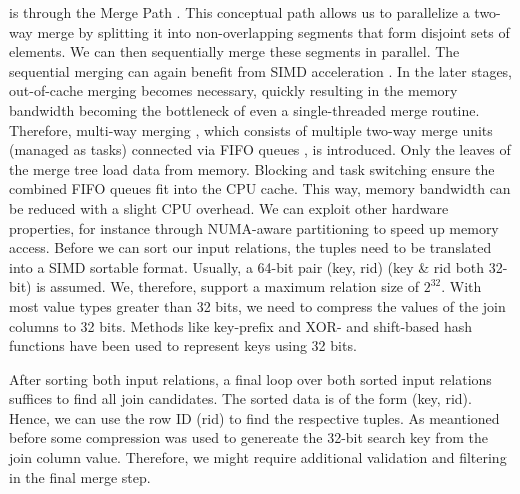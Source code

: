 is through the Merge Path \cite{MergePath}. This conceptual path allows us to parallelize a two-way merge by splitting
it into non-overlapping segments that form disjoint sets of elements. We can then sequentially
merge these segments in parallel. The sequential merging can again benefit from SIMD acceleration \cite{Watkins}.
In the later stages, out-of-cache merging becomes necessary, quickly resulting in the memory
bandwidth becoming the bottleneck of even a single-threaded merge routine. Therefore, multi-way
merging \cite{Balkesen}, which consists of multiple two-way merge units (managed as tasks) connected via FIFO queues
, is introduced. Only the leaves of the merge tree load data from memory. Blocking and task switching 
ensure the combined FIFO queues fit into the CPU cache. This way, memory bandwidth can be reduced
with a slight CPU overhead. We can exploit other hardware properties, for instance through 
NUMA-aware partitioning to speed up memory access.
Before we can sort our input relations, the tuples need to be translated into a SIMD sortable
format. Usually, a 64-bit pair (key, rid) (key \& rid both 32-bit) is assumed. We, therefore,
support a maximum relation size of $2^{32}$. With most value types greater
than 32 bits, we need to compress the values of the join columns to 32 bits. Methods like 
key-prefix \cite{chris_nyberg__1994} and XOR- and shift-based hash functions \cite{1319989} have 
been used to represent keys using 32 bits.

After sorting both input relations, a final loop over both sorted input relations suffices to find all
join candidates. The sorted data is of the form (key, rid). Hence, we can use the row ID (rid) to
find the respective tuples. As meantioned before some compression was used to genereate the 32-bit
search key from the join column value. Therefore, we might require additional validation and 
filtering in the final merge step.
